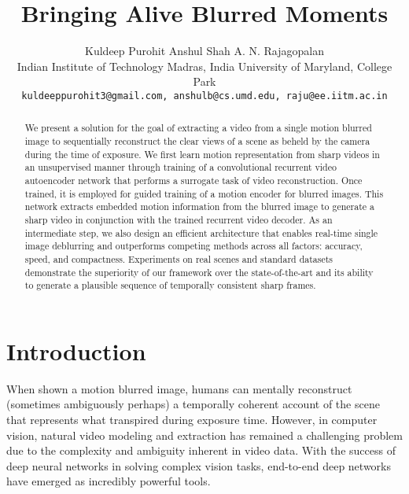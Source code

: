 \documentclass[10pt,twocolumn,letterpaper]{article}
\begin{document}
\title{Bringing Alive Blurred Moments}


\author{Kuldeep Purohit \qquad Anshul Shah \qquad A. N. Rajagopalan \\
 Indian Institute of Technology Madras, India \hspace{1cm}
 University of Maryland, College Park\\
{\tt\small kuldeeppurohit3@gmail.com, anshulb@cs.umd.edu, raju@ee.iitm.ac.in}
} 










\maketitle


\begin{abstract}
We present a solution for the goal of extracting a video from a single motion blurred image to sequentially reconstruct the clear views of a scene as beheld by the camera during the time of exposure. We first learn motion representation from sharp videos in an unsupervised manner through training of a convolutional recurrent video autoencoder network that performs a surrogate task of video reconstruction. Once trained, it is employed for guided training of a motion encoder for blurred images. This network extracts embedded motion information from the blurred image to generate a sharp video in conjunction with the trained recurrent video decoder. As an intermediate step, we also design an efficient architecture that enables real-time single image deblurring and outperforms competing methods across all factors: accuracy, speed, and compactness. Experiments on real scenes and standard datasets demonstrate the superiority of our framework over the state-of-the-art and its ability to generate a plausible sequence of temporally consistent sharp frames. 
\end{abstract}

\section{Introduction}

When shown a motion blurred image, humans can mentally reconstruct (sometimes ambiguously perhaps) a temporally coherent account of the scene that represents what transpired during exposure time. However, in computer vision, natural video modeling and extraction has remained a challenging problem due to the complexity and ambiguity inherent in video data. With the success of deep neural networks in solving complex vision tasks, end-to-end deep networks have emerged as incredibly powerful tools. 
\end{document}
